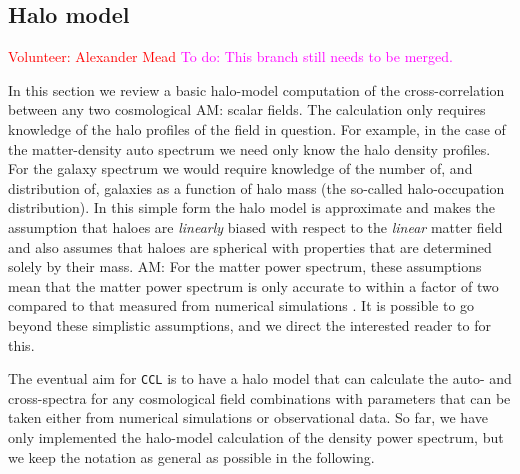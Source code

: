 \documentclass[\docopts]{\docclass}
\newcommand{\todo}[1]{\textcolor{magenta}{To do: #1}}
\newcommand{\vol}[1]{\textcolor{red}{Volunteer: #1}}
\newcommand{\elisa}[1]{\textcolor{green!10!orange!90!}{EC: #1}}
\newcommand{\Mead}[1]{\textcolor{red!50!cyan}{AM: #1}}
\newcommand{\ccl}{{\tt CCL}\xspace}
\begin{document}

\subsection{Halo model}
\label{sec:halo_model}
\vol{Alexander Mead}
\todo{This branch still needs to be merged.}


In this section we review a basic halo-model computation \citep{Seljak2000,Peacock2000,Cooray2002} of the cross-correlation between any two cosmological \Mead{scalar} fields. The calculation only requires knowledge of the halo profiles of the field in question. For example, in the case of the matter-density auto spectrum we need only know the halo density profiles. For the galaxy spectrum we would require knowledge of the number of, and distribution of, galaxies as a function of halo mass (the so-called halo-occupation distribution). In this simple form the halo model is approximate and makes the assumption that haloes are \emph{linearly} biased with respect to the \emph{linear} matter field and also assumes that haloes are spherical with properties that are determined solely by their mass. \Mead{For the matter power spectrum, these assumptions mean that the matter power spectrum is only accurate to within a factor of two compared to that measured from numerical simulations \citep{Mead2015}.} It is possible to go beyond these simplistic assumptions, and we direct the interested reader to \cite{Cooray2002,Smith2007,Giocoli2010,Smith2011} for this. 


The eventual aim for \ccl is to have a halo model that can calculate the auto- and cross-spectra for any cosmological field combinations with parameters that can be taken either from numerical simulations or observational data. So far, we have only implemented the halo-model calculation of the density power spectrum, but we keep the notation as general as possible in the following.

\end{document}

